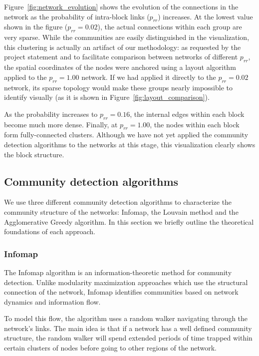 \documentclass{article}
\begin{document}
Figure~\ref{fig:network_evolution} shows the evolution of the connections in the network as the probability of intra-block links ($p_{rr}$) increases. At the lowest value shown in the figure ($p_{rr} = 0.02$), the actual connections within each group are very sparse. While the communities are easily distinguished in the visualization, this clustering is actually an artifact of our methodology: as requested by the project statement and to facilitate comparison between networks of different $p_{rr}$, the spatial coordinates of the nodes were anchored using a layout algorithm applied to the $p_{rr} = 1.00$ network. If we had applied it directly to the $p_{rr} = 0.02$ network, its sparse topology would make these groups nearly impossible to identify visually (as it is shown in Figure~\ref{fig:layout_comparison}). 

As the probability increases to $p_{rr} = 0.16$, the internal edges within each block become much more dense. Finally, at $p_{rr} = 1.00$, the nodes within each block form fully-connected clusters. Although we have not yet applied the community detection algorithms to the networks at this stage, this visualization clearly shows the block structure.


\subsection{Community detection algorithms}

We use three different community detection algorithms to characterize the community structure of the networks: Infomap, the Louvain method and the Agglomerative Greedy algorithm. In this section we briefly outline the theoretical foundations of each approach.

\subsubsection{Infomap}

The Infomap algorithm \cite{rosvall2009map} is an information-theoretic method for community detection. Unlike modularity maximization approaches which use the structural connection of the network, Infomap identifies communities based on network dynamics and information flow.

To model this flow, the algorithm uses a random walker navigating through the network's links. The main idea is that if a network has a well defined community structure, the random walker will spend extended periods of time trapped within certain clusters of nodes before going to other regions of the network. 
\end{document}
